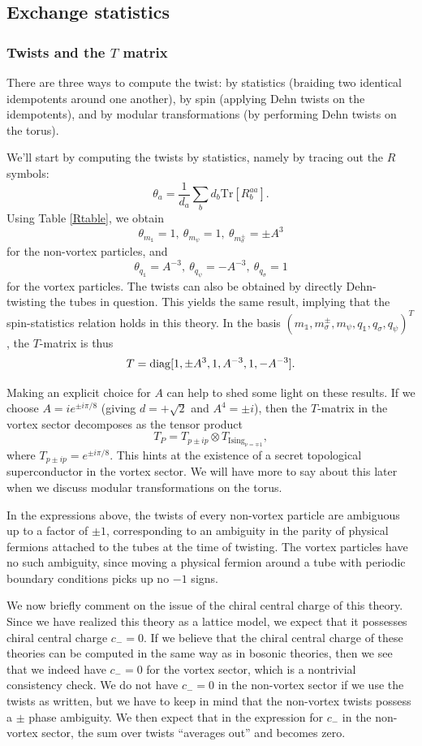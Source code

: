 \documentclass[12pt,a4paper]{article}
\newcommand{\tp}{\otimes}
\newcommand{\unit}{\mathds{1}}
\newcommand\be            {\begin{equation}}
\newcommand\ee            {\end{equation}}
\begin{document}
\subsection{Exchange statistics}

\subsubsection{Twists and the $T$ matrix}
There are three ways to compute the twist: by statistics (braiding two identical idempotents around one another), by spin (applying Dehn twists on the idempotents), and by modular transformations (by performing Dehn twists on the torus). 

We'll start by computing the twists by statistics, namely by tracing out the $R$ symbols:
\be \label{Tmattr} \theta_a = \frac{1}{d_a}\sum_b d_b \text{Tr}[R^{aa}_b].\ee
Using Table \ref{Rtable}, we obtain
\be \theta_{m_\unit} = 1,\ \theta_{m_\psi} = 1,\ \theta_{m^\pm_\sigma} = \pm A^3\ee
for the non-vortex particles, and 
\be \theta_{q_\unit} = A^{-3},\ \theta_{q_\psi} = -A^{-3},\ \theta_{q_\sigma} = 1\ee
for the vortex particles. The twists can also be obtained by directly Dehn-twisting the tubes in question. This yields the same result, implying that the spin-statistics relation holds in this theory. In the basis $(m_\unit,m^\pm_\sigma,m_\psi,q_\unit,q_\sigma,q_\psi)^T$, the $T$-matrix is thus
\be T = {\rm diag}[1,\pm A^3,1,A^{-3},1,-A^{-3}].\ee

Making an explicit choice for $A$ can help to shed some light on these results. If we choose $A = ie^{\pm i \pi/8}$ (giving $d=+\sqrt{2}$ and $A^4 = \pm i$), then the $T$-matrix in the vortex sector decomposes as the tensor product
\be T_P = T_{p\pm ip} \tp T_{\text{Ising}_{\nu =\mp1}},\ee
where $T_{p\pm ip} = e^{\pm i\pi/8}$. %
This hints at the existence of a secret topological superconductor in the vortex sector. We will have more to say about this later when we discuss modular transformations on the torus.

In the expressions above, the twists of every non-vortex particle are ambiguous up to a factor of $\pm1$, corresponding to an ambiguity in the parity of physical fermions attached to the tubes at the time of twisting. The vortex particles have no such ambiguity, since moving a physical fermion around a tube with periodic boundary conditions picks up no $-1$ signs.   

We now briefly comment on the issue of the chiral central charge of this theory. Since we have realized this theory as a lattice model, we expect that it possesses chiral central charge $c_- = 0$. 
If we believe that the chiral central charge of these theories can be computed in the same way as in bosonic theories, then we see that we indeed have $c_- =0$ for the vortex sector, which is a nontrivial consistency check. We do not have $c_-=0$ in the non-vortex sector if we use the twists as written, but we have to keep in mind that the non-vortex twists possess a $\pm$ phase ambiguity. We then expect that in the expression for $c_-$ in the non-vortex sector, the sum over twists ``averages out'' and becomes zero. 
\end{document}
